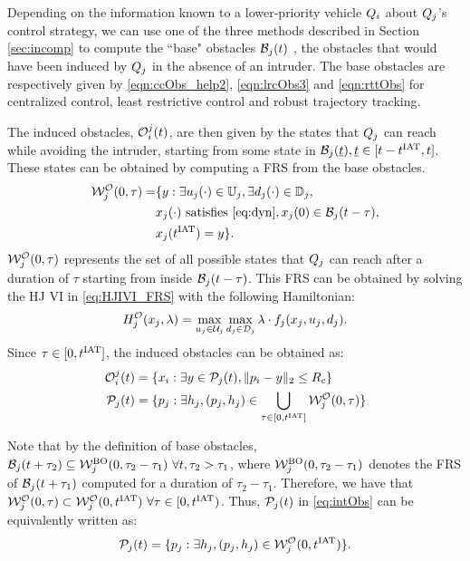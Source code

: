Depending on the information known to a lower-priority vehicle $Q_i$ about $Q_j$'s control strategy, we can use one of the three methods described in Section \ref{sec:incomp} to compute the ``base" obstacles $\mathcal{B}_j(t)$ , the obstacles that would have been induced by $Q_j$ in the absence of an intruder. The base obstacles are respectively given by \eqref{eqn:ccObs_help2}, \eqref{eqn:lrcObs3} and \eqref{eqn:rttObs} for centralized control, least restrictive control and robust trajectory tracking.  

The induced obstacles, $\mathcal{O}_i^j(t)$, are then given by the states that $Q_j$ can reach while avoiding the intruder, starting from some state in $\mathcal{B}_j(\underline{t}), \underline{t} \in [t-t^\text{IAT}, t]$. These states can be obtained by computing a FRS from the base obstacles.
\begin{equation} \label{eq:FRS_intObs1}
\begin{aligned}
\frs_{j}^{\mathcal{O}}(0, \tau) = & \{y: \exists \ctrl_j(\cdot) \in \cfset_j, \exists \dstb_j(\cdot) \in \dfset_j, \\
& \state_j(\cdot) \text{ satisfies \eqref{eq:dyn}}, \state_j(0) \in \boset_j(t-\tau), \\
& \state_j(\iat) = y\}.
\end{aligned}
\end{equation}
$\mathcal{W}_{j}^{\mathcal{O}}(0, \tau)$ represents the set of all possible states that $Q_j$ can reach after a duration of $\tau$ starting from inside $\mathcal{B}_j(t-\tau)$. This FRS can be obtained by solving the HJ VI in \eqref{eq:HJIVI_FRS} with the following Hamiltonian:
\begin{equation}
\ham_{j}^{\mathcal{O}}(\state_j, \costate) = \max_{\ctrl_j \in \cset_j} \max_{\dstb_j \in \dset_j} \costate \cdot f_j (\state_j, \ctrl_j, \dstb_j) \label{intobs2}.
\end{equation} 
Since $\tau \in [0, t^\text{IAT}]$, the induced obstacles can be obtained as:
\begin{equation} \label{eq:intObs}
\begin{aligned}
\ioset_i^j(t) & = \{\state_i: \exists y \in \pfrs_j(t), \|\pos_i - y\|_2 \le \rc \}\\
\pfrs_j(t) & = \{p_j: \exists \npos_j, (p_j, \npos_j) \in \bigcup_{\tau \in [0, \iat]} \frs_{j}^{\mathcal{O}}(0, \tau) \}
\end{aligned}
\end{equation}

Note that by the definition of base obstacles, $\mathcal{B}_j(t+\tau_2) \subseteq \mathcal{W}_{j}^{\text{BO}}(0, \tau_2-\tau_1) ~\forall t, \tau_2 > \tau_1$, where $\mathcal{W}_{j}^{\text{BO}}(0, \tau_2-\tau_1)$ denotes the FRS of $\mathcal{B}_j(t+\tau_1)$ computed for a duration of $\tau_2-\tau_1$. Therefore, we have that $\mathcal{W}_{j}^{\mathcal{O}}(0, \tau) \subset \mathcal{W}_{j}^{\mathcal{O}}(0, t^\text{IAT}) ~\forall \tau \in [0, t^\text{IAT})$. Thus, $\mathcal{P}_j(t)$ in \eqref{eq:intObs} can be equivalently written as:
\begin{equation} \label{eq:intObs_help1}
\pfrs_j(t) = \{p_j: \exists \npos_j, (p_j, \npos_j) \in \frs_{j}^{\mathcal{O}}(0, \iat) \}.
\end{equation}

